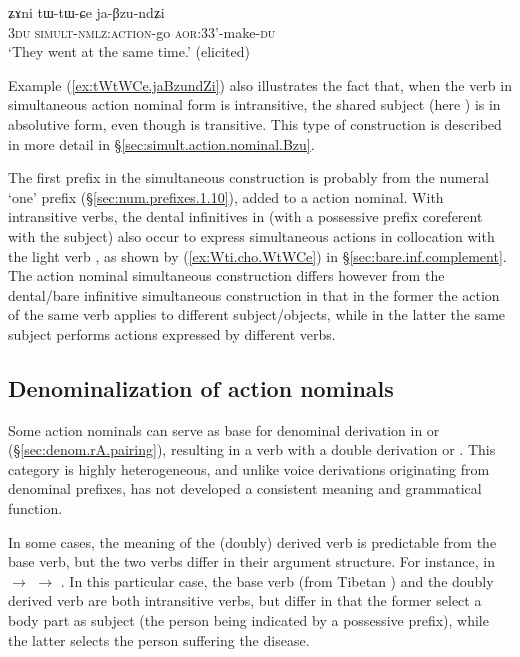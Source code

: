 \begin{exe}
\ex \label{ex:tWtWCe.jaBzundZi}
\gll ʑɤni tɯ-tɯ-ɕe ja-βzu-ndʑi \\
\textsc{3du} \textsc{simult}-\textsc{nmlz}:\textsc{action}-go \textsc{aor}:3\fl{}3'-make-\textsc{du} \\
\glt `They went at the same time.' (elicited)
 \end{exe}
 
 Example (\ref{ex:tWtWCe.jaBzundZi}) also illustrates the fact that, when the verb in simultaneous action nominal form is intransitive, the shared subject (here ) is in absolutive form, even though  is transitive. This type of construction is described in more detail in §\ref{sec:simult.action.nominal.Bzu}.

The first  prefix in the simultaneous construction is probably from the numeral  `one' prefix (§\ref{sec:num.prefixes.1.10}), added to a  action nominal. With intransitive verbs, the dental infinitives in  (with a possessive prefix coreferent with the subject) also occur to express simultaneous actions in collocation with the light verb , as shown by (\ref{ex:Wti.cho.WtWCe}) in §\ref{sec:bare.inf.complement}. The action nominal simultaneous construction differs however from the dental/bare infinitive simultaneous construction in that in the former the action of the same verb applies to different subject/objects, while in the latter the same subject performs actions expressed by different verbs.

\subsection{Denominalization of action nominals}  \label{sec:denominalization.action.nominal}
Some  action nominals can serve as base for denominal derivation in  or  (§\ref{sec:denom.rA.pairing}), resulting in a verb with a double derivation  or . This category is highly heterogeneous, and unlike voice derivations originating from denominal prefixes, has not developed a consistent meaning and grammatical function.

In some cases, the meaning of the (doubly) derived verb is predictable from the base verb, but the two verbs differ in their argument structure. For instance, in  $\rightarrow$  $\rightarrow$ . In this particular case, the base verb (from Tibetan ) and the doubly derived verb  are both intransitive verbs, but differ in that the former select a body part as subject (the person being indicated by a possessive prefix), while the latter selects the person suffering the disease.

